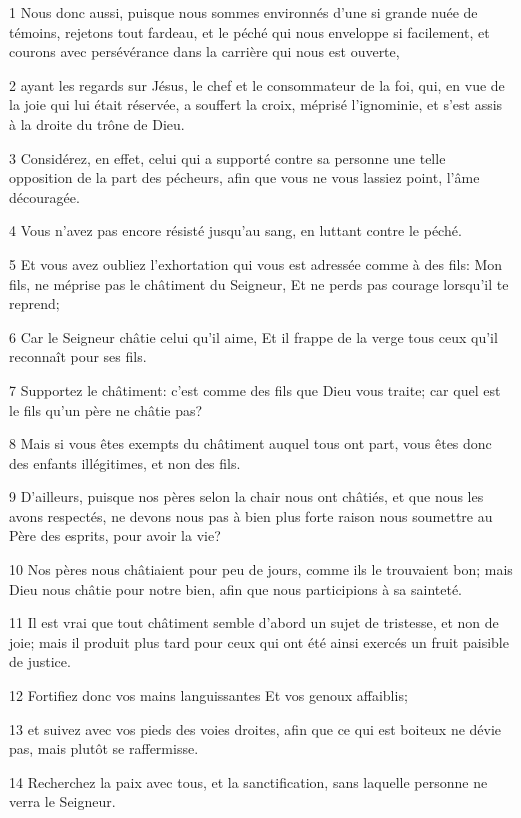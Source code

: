\par 1 Nous donc aussi, puisque nous sommes environnés d'une si grande nuée de témoins, rejetons tout fardeau, et le péché qui nous enveloppe si facilement, et courons avec persévérance dans la carrière qui nous est ouverte,
\par 2 ayant les regards sur Jésus, le chef et le consommateur de la foi, qui, en vue de la joie qui lui était réservée, a souffert la croix, méprisé l'ignominie, et s'est assis à la droite du trône de Dieu.
\par 3 Considérez, en effet, celui qui a supporté contre sa personne une telle opposition de la part des pécheurs, afin que vous ne vous lassiez point, l'âme découragée.
\par 4 Vous n'avez pas encore résisté jusqu'au sang, en luttant contre le péché.
\par 5 Et vous avez oubliez l'exhortation qui vous est adressée comme à des fils: Mon fils, ne méprise pas le châtiment du Seigneur, Et ne perds pas courage lorsqu'il te reprend;
\par 6 Car le Seigneur châtie celui qu'il aime, Et il frappe de la verge tous ceux qu'il reconnaît pour ses fils.
\par 7 Supportez le châtiment: c'est comme des fils que Dieu vous traite; car quel est le fils qu'un père ne châtie pas?
\par 8 Mais si vous êtes exempts du châtiment auquel tous ont part, vous êtes donc des enfants illégitimes, et non des fils.
\par 9 D'ailleurs, puisque nos pères selon la chair nous ont châtiés, et que nous les avons respectés, ne devons nous pas à bien plus forte raison nous soumettre au Père des esprits, pour avoir la vie?
\par 10 Nos pères nous châtiaient pour peu de jours, comme ils le trouvaient bon; mais Dieu nous châtie pour notre bien, afin que nous participions à sa sainteté.
\par 11 Il est vrai que tout châtiment semble d'abord un sujet de tristesse, et non de joie; mais il produit plus tard pour ceux qui ont été ainsi exercés un fruit paisible de justice.
\par 12 Fortifiez donc vos mains languissantes Et vos genoux affaiblis;
\par 13 et suivez avec vos pieds des voies droites, afin que ce qui est boiteux ne dévie pas, mais plutôt se raffermisse.
\par 14 Recherchez la paix avec tous, et la sanctification, sans laquelle personne ne verra le Seigneur.
